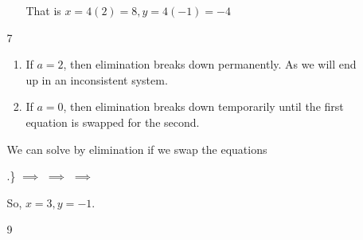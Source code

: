 \documentclass[12pt,letterpaper]{article}
\begin{document}
\begin{enumerate}
\begin{enumerate}
\begin{itemize}
              That is $x = 4(2) = 8, y = 4(-1) = -4$
          \end{itemize}

        \item [7]
          \begin{enumerate}
            \item
              If $a = 2$, then elimination breaks down permanently.
              As we will end up in an inconsistent system.
            \item
              If $a = 0$, then elimination breaks down temporarily
              until the first equation is swapped for the second.
          \end{enumerate}

          We can solve by elimination if we swap the equations

          \sysdelim.\}
          $\implies$
          $\implies$
          $\implies$

          So, $x = 3, y = -1$.
        \item [9]


\end{enumerate}
\end{enumerate}
\end{document}
